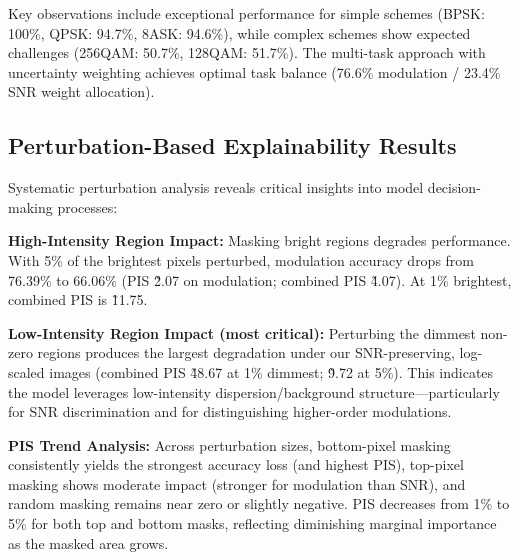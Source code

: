 \documentclass{ELSP}
\begin{document}
Key observations include exceptional performance for simple schemes (BPSK: 100\%, QPSK: 94.7\%, 8ASK: 94.6\%), while complex schemes show expected challenges (256QAM: 50.7\%, 128QAM: 51.7\%). The multi-task approach with uncertainty weighting achieves optimal task balance (76.6\% modulation / 23.4\% SNR weight allocation).

\subsection{Perturbation-Based Explainability Results}

Systematic perturbation analysis reveals critical insights into model decision-making processes:

\textbf{High-Intensity Region Impact:} Masking bright regions degrades performance. With 5\% of the brightest pixels perturbed, modulation accuracy drops from 76.39\% to 66.06\% (PIS \~2.07 on modulation; combined PIS \~4.07). At 1\% brightest, combined PIS is \~11.75.

\textbf{Low-Intensity Region Impact (most critical):} Perturbing the dimmest non-zero regions produces the largest degradation under our SNR-preserving, log-scaled images (combined PIS \~48.67 at 1\% dimmest; \~9.72 at 5\%). This indicates the model leverages low-intensity dispersion/background structure—particularly for SNR discrimination and for distinguishing higher-order modulations.

\textbf{PIS Trend Analysis:} Across perturbation sizes, bottom-pixel masking consistently yields the strongest accuracy loss (and highest PIS), top-pixel masking shows moderate impact (stronger for modulation than SNR), and random masking remains near zero or slightly negative. PIS decreases from 1\% to 5\% for both top and bottom masks, reflecting diminishing marginal importance as the masked area grows.
\end{document}
